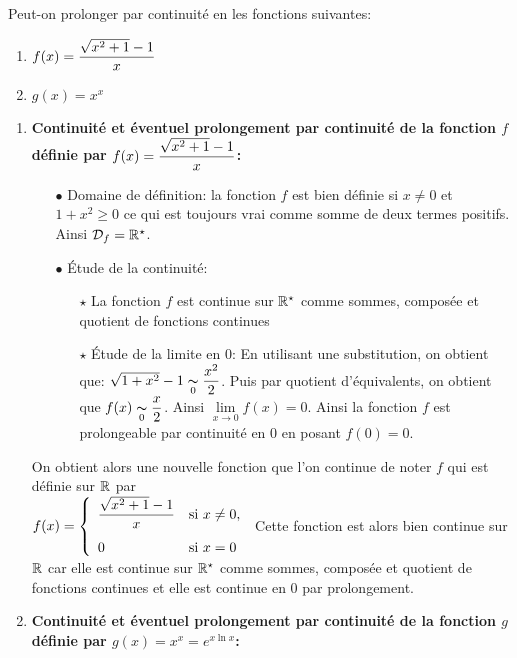 \documentclass[a4paper, 11pt,reqno]{article}
\begin{document}
\begin{exercice}
Peut-on prolonger par continuit\'e en les fonctions suivantes:
\begin{enumerate}
\item $f(x)=\displaystyle\frac{\sqrt{x^2+1}-1}{x}$
\item $g(x)=x^x$
\end{enumerate}
\end{exercice}
\begin{correction}
\begin{enumerate}
\item \textbf{Continuit\'e et \'eventuel prolongement par continuit\'e de la fonction $f$ d\'efinie par $f(x)=\displaystyle\frac{\sqrt{x^2+1}-1}{x}$:}
\begin{itemize}
\item[$\bullet$] Domaine de d\'efinition: la fonction $f$ est bien d\'efinie si $x\not= 0$ et $1+x^2\geq 0$ ce qui est toujours vrai comme somme de deux termes positifs. Ainsi $\mathcal{D}_f=\mathbb{R}^{\star}$.
\item[$\bullet$] \'Etude de la continuit\'e:
\begin{itemize}
\item[$\star$] La fonction $f$ est continue sur $\mathbb{R}^{\star}$ comme sommes, compos\'ee et quotient de fonctions continues
\item[$\star$] \'Etude de la limite en $0$: En utilisant une substitution, on obtient que: $\sqrt{1+x^2}-1\underset{0}{\thicksim} \displaystyle\frac{x^2}{2}$. Puis par quotient d'\'equivalents, on obtient que $f(x)\underset{0}{\thicksim} \displaystyle\frac{x}{2}$. Ainsi $\lim\limits_{x\to 0} f(x)=0$. Ainsi la fonction $f$ est prolongeable par continuit\'e en $0$ en posant $f(0)=0$.
\end{itemize}
\end{itemize}
On obtient alors une nouvelle fonction que l'on continue de noter $f$ qui est d\'efinie sur $\mathbb{R}$ par\\
\noindent  $f(x)=\left\lbrace \begin{array}{ll} \ddp\frac{\sqrt{x^2+1}-1}{x}& \hbox{si}\ x\not= 0,\vsec\\ 0& \hbox{si}\ x=0 \end{array}\right.$ Cette fonction est alors bien continue sur $\mathbb{R}$ car elle est continue sur $\mathbb{R}^{\star}$ comme sommes, compos\'ee et quotient de fonctions continues et elle est continue en $0$ par prolongement.
\item  \textbf{Continuit\'e et \'eventuel prolongement par continuit\'e de la fonction $g$ d\'efinie par $g(x)=x^x=e^{x\ln{x}}$:}

\end{enumerate}
\end{correction}
\end{document}

